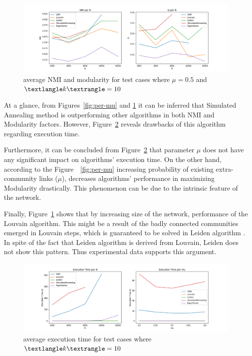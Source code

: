 \documentclass[11pt,a4paper]{article}
\begin{document}
\begin{figure}[H]
	\includegraphics[width=\linewidth]{per-n.png}
	\caption{average NMI and modularity for test cases where $\mu = 0.5$ and $\textlangle k \textrangle = 10$}
	\label{fig:per-n}
\end{figure}

At a glance, from Figures~\ref{fig:per-mu} and \ref{fig:per-n} it can be inferred that Simulated Annealing method is outperforming other algorithms in both NMI and Modularity factors. However, Figure~\ref{fig:exec-time} reveals drawbacks of this algorithm regarding execution time. 

Furthermore, it can be concluded from Figure~\ref{fig:exec-time} that parameter $\mu$ does not have any significant impact on algorithms' execution time. On the other hand, according to the Figure~~\ref{fig:per-mu} increasing probability of existing extra-community links ($\mu$), decreases algorithms' performance in maximizing Modularity drastically. This phenomenon can be due to the intrinsic feature of the network.

Finally, Figure~\ref{fig:per-n} shows that by increasing size of the network, performance of the Louvain algorithm. This might be a result of the badly connected communities emerged in Louvain steps, which is guaranteed to be solved in Leiden algorithm \cite{leiden}. In spite of the fact that Leiden algorithm is derived from Louvain, Leiden does not show this pattern. Thus experimental data supports this argument.


\begin{figure}[H]
	\includegraphics[width=\linewidth]{exec_time.png}
	\caption{average execution time for test cases where $\textlangle k \textrangle = 10$}
	\label{fig:exec-time}
\end{figure}
\end{document}
